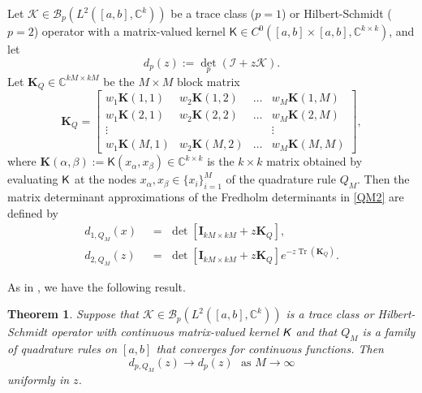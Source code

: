\documentclass{birkjour}
\newtheorem{thm}{Theorem}[section]
\theoremstyle{definition}
\theoremstyle{remark}
\numberwithin{equation}{section}
\newcommand{\cB}{{\mathcal B}}
\begin{document}
Let $\mathcal{K} \in \cB_p(L^2([a,b], \mathbb{C}^k))$ be a trace class ($p=1$) 
or Hilbert-Schmidt ($p=2$) operator with a matrix-valued kernel $\textsf{K} \in C^0 ([a,b] \times [a,b], \mathbb{C}^{k \times k})$, and let 
\begin{equation}\label{QM2}
    d_p(z) := {\det}_p(\mathcal{I} + z\mathcal{K}).
\end{equation}
Let $\mathbf{K}_Q \in \mathbb{C}^{kM \times kM}$  be the $M \times M$ block matrix 
\begin{equation}\label{QM4}
    \mathbf{K}_Q = \begin{bmatrix} w_1\mathbf{K}(1,1) & w_2 \mathbf{K}(1,2) & \dots & w_M \mathbf{K}(1,M)\\
    w_1 \mathbf{K}(2,1) & w_2 \mathbf{K}(2,2) & \dots & w_M \mathbf{K}(2,M)\\
    \vdots & & & \vdots\\
    w_1 \mathbf{K}(M,1) & w_2 \mathbf{K}(M,2) & \dots & w_M \mathbf{K}(M,M)
    \end{bmatrix},
\end{equation}
where 
   $ \mathbf{K}(\alpha, \beta) := \textsf{K}(x_{\alpha}, x_{\beta}) \in \mathbb{C}^{k \times k}$
is the $k \times k$ matrix obtained by evaluating $\textsf K$ at the nodes  $x_{\alpha}, x_{\beta} \in \{x_i\}_{i=1}^M$ of the quadrature rule $Q_M$.
Then the matrix determinant approximations of the Fredholm determinants in 
 \eqref{QM2} are defined by
\begin{align}\label{}
    d_{1,Q_M}(x) \,\,&=\,\, \det[\mathbf{I}_{kM \times kM} + z \mathbf{K}_{Q}],
\\
    d_{2,Q_M}(z) \,\,&=\,\, {\det}[\mathbf{I}_{kM \times kM} + z\mathbf{K}_Q]e^{-z \operatorname{Tr}(\mathbf{K}_Q)}.
\end{align}

As in  \cite[Theorems 6.1 \& 8.1]{Bornemann},  we have the following result.
\begin{thm}
Suppose that $\mathcal{K} \in \cB_p(L^2([a,b], \mathbb{C}^k))$ is a trace class or Hilbert-Schmidt operator with continuous matrix-valued kernel $\emph{\textsf{K}}$ and that $Q_M$ is a family of quadrature rules on $[a,b]$ that converges for continuous functions. Then
\begin{equation}
    d_{p,Q_M}(z) \to d_p(z) \,\, \text{ as } M \to \infty
\end{equation}
uniformly in $z$.
\end{thm}
\end{document}
